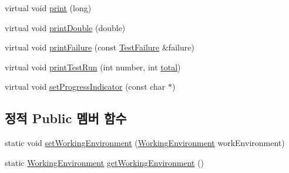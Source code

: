 \begin{DoxyCompactItemize}
\item 
virtual void \hyperlink{class_test_output_afdf7e5004a8aead20ea3b1ddec76fa73}{print} (long)
\item 
virtual void \hyperlink{class_test_output_a0ed13c187762336a2bf0fd89687b014a}{print\+Double} (double)
\item 
virtual void \hyperlink{class_test_output_abda4b89457f485fa538443ee10aecfe8}{print\+Failure} (const \hyperlink{class_test_failure}{Test\+Failure} \&failure)
\item 
virtual void \hyperlink{class_test_output_a0cffc4628d21b0cd25649f9084927ca9}{print\+Test\+Run} (int number, int \hyperlink{test__intervals_8c_ac7af894858cf396a219d632f40afdc8d}{total})
\item 
virtual void \hyperlink{class_test_output_a97c09fc275d40b7ec559aaa91843cdcd}{set\+Progress\+Indicator} (const char $\ast$)
\end{DoxyCompactItemize}
\subsection*{정적 Public 멤버 함수}
\begin{DoxyCompactItemize}
\item 
static void \hyperlink{class_test_output_a25907ddd60d8454ca78f81edef6c77c3}{set\+Working\+Environment} (\hyperlink{class_test_output_a0541851f863713454486a9fb3080f766}{Working\+Environment} work\+Environment)
\item 
static \hyperlink{class_test_output_a0541851f863713454486a9fb3080f766}{Working\+Environment} \hyperlink{class_test_output_a90d5028d0f7f6f41ca2dced042a8709d}{get\+Working\+Environment} ()
\end{DoxyCompactItemize}
